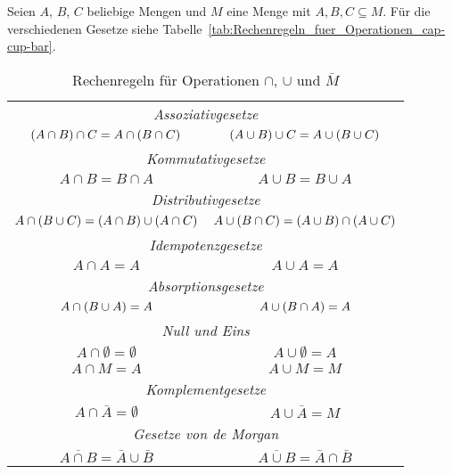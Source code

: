 \begin{theorem}
Seien $A$, $B$, $C$ beliebige Mengen und $M$ eine Menge mit $A, B, C \subseteq M$. Für die verschiedenen Gesetze siehe Tabelle~\vref{tab:Rechenregeln_fuer_Operationen_cap-cup-bar}.
\begin{table}[htb]
\centering
\begin{tabular}{cc}
\toprule
\multicolumn{2}{c}{\emph{Assoziativgesetze}}\\
$\left(A \cap B\right) \cap C = A \cap \left(B \cap C\right)$ & $\left(A \cup B\right) \cup C = A \cup \left(B \cup C\right)$\\
\midrule

\multicolumn{2}{c}{\emph{Kommutativgesetze}}\\
$A \cap B = B \cap A$ & $A \cup B = B \cup A$\\
\midrule

\multicolumn{2}{c}{\emph{Distributivgesetze}}\\
$A \cap \left(B \cup C\right) = \left(A \cap B\right) \cup \left(A \cap C\right)$ & $A \cup \left(B \cap C\right) = \left(A \cup B\right) \cap \left(A \cup C\right)$\\
\midrule

\multicolumn{2}{c}{\emph{Idempotenzgesetze}}\\
$A \cap A = A$ & $A \cup A = A$\\
\midrule

\multicolumn{2}{c}{\emph{Absorptionsgesetze}}\\
$A \cap \left(B \cup A\right) = A$ & $A \cup \left(B \cap A\right) = A$\\
\midrule

\multicolumn{2}{c}{\emph{Null und Eins}}\\
$A \cap \emptyset = \emptyset$ & $A \cup \emptyset = A$\\
$A \cap M = A$ & $A \cup M = M$\\
\midrule

\multicolumn{2}{c}{\emph{Komplementgesetze}}\\
$A \cap \bar{A} = \emptyset$ & $A \cup \bar{A} = M$\\
\midrule

\multicolumn{2}{c}{\emph{Gesetze von de Morgan}}\\
$\overline{A \cap B} = \bar{A} \cup \bar{B}$ & $\overline{A \cup B} = \bar{A} \cap \bar{B}$\\
\bottomrule
\end{tabular}
\label{tab:Rechenregeln_fuer_Operationen_cap-cup-bar}
\caption{Rechenregeln für Operationen $\cap$, $\cup$ und $\bar{M}$}
\end{table}
\end{theorem}

